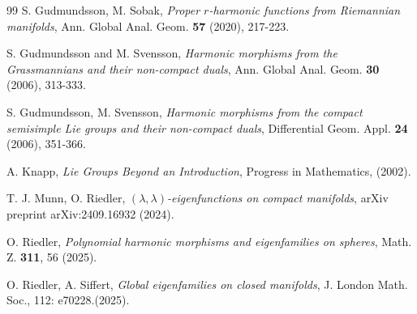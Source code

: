 \documentclass[11pt,reqno]{amsart}
\theoremstyle{plain}
\theoremstyle{definition}
\numberwithin{equation}{section}
\numberwithin{equation}{section}
\begin{document}
\begin{thebibliography}{99}
S. Gudmundsson, M. Sobak,
{\it Proper $r$-harmonic functions from Riemannian manifolds},
Ann. Global Anal. Geom. {\bf 57} (2020), 217-223.

S. Gudmundsson and M. Svensson,
{\it Harmonic morphisms from the Grassmannians and their non-compact duals},
Ann. Global Anal. Geom. {\bf 30} (2006), 313-333.

S. Gudmundsson, M. Svensson,
{\it Harmonic morphisms from the compact semisimple Lie groups and their non-compact duals},
Differential Geom. Appl. {\bf 24} (2006), 351-366.


A. Knapp,
{\it Lie Groups Beyond an Introduction},
Progress in Mathematics, (2002).

T. J. Munn, O. Riedler,
{\it $(\lambda,\lambda)$-eigenfunctions on compact manifolds},
arXiv preprint arXiv:2409.16932 (2024).


O. Riedler,
{\it Polynomial harmonic morphisms and eigenfamilies on spheres},
Math. Z. {\bf 311}, 56 (2025).

O. Riedler, A. Siffert,
{\it Global eigenfamilies on closed manifolds},
 J. London Math. Soc., 112: e70228.(2025).

\end{thebibliography}
\end{document}
